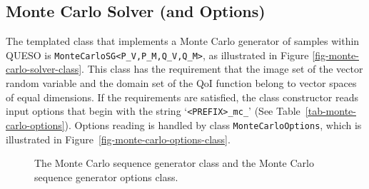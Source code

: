 \subsection{Monte Carlo Solver (and Options)}

The templated class that implements a Monte Carlo generator of samples within QUESO is \verb+MonteCarloSG<P_V,P_M,Q_V,Q_M>+, as illustrated in Figure \ref{fig-monte-carlo-solver-class}.
This class has the requirement that the image set of the vector random variable  and the domain set of the QoI function belong to vector spaces of equal dimensions. If the requirements are satisfied, the class constructor reads input options that begin with the string `\verb+<PREFIX>_mc_+' (See Table~\ref{tab-monte-carlo-options}). Options reading is handled by class \verb+MonteCarloOptions+, which is illustrated in Figure~\ref{fig-monte-carlo-options-class}.


\begin{figure}[p]
\centering
{}
\vspace*{-.2cm}
\caption{The Monte Carlo sequence generator class and the Monte Carlo sequence generator options class.}
\end{figure}



